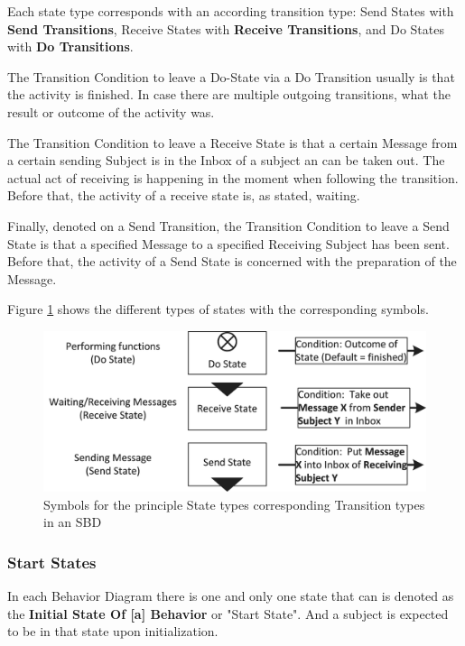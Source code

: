 Each state type corresponds with an according transition type: Send States with \textbf{Send Transitions}, Receive States with \textbf{Receive Transitions}, and Do States with \textbf{Do Transitions}. 

The Transition Condition to leave a Do-State via a Do Transition usually is that the activity is finished. In case there are multiple outgoing transitions, what the result or outcome of the activity was.

The Transition Condition to leave a Receive State is that a certain Message from a certain sending Subject is in the Inbox of a subject an can be taken out. The actual act of receiving is happening in the moment when following the transition. Before that, the activity of a receive state is, as stated, waiting. 

Finally, denoted on a Send Transition, the Transition Condition to leave a Send State is that a specified Message to a specified Receiving Subject has been sent. Before that, the activity of a Send State is concerned with the preparation of the Message.

Figure \ref{fig:behavior-symbole} shows the different types of states with the corresponding symbols.

\begin{figure}[htbp]
	\centering
	\includegraphics[width=0.9\linewidth]{Figures/Ontology/SubjectBehavior/Behavior-Symbole_NEW2.png}
	\caption[Symbols for the principle State types and corresponding Transition types in an SBD]{Symbols for the principle State types corresponding Transition types in an SBD}
	\label{fig:behavior-symbole}
\end{figure}


\subsubsection{Start States}
\label{sec:startStates}

In each Behavior Diagram there is one and only one state that can is denoted as the \textbf{Initial State Of [a] Behavior} or "Start State". And a subject is expected to be in that state upon initialization. 

